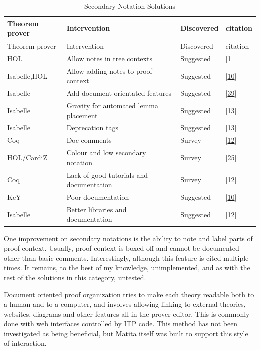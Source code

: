\documentclass[
]{article}
\begin{document}
\hypertarget{tbl:secondary_notation}{}
\begin{longtable}[]{@{}llll@{}}
\caption{\label{tbl:secondary_notation}Secondary Notation
Solutions}\tabularnewline
\toprule
Theorem prover & Intervention & Discovered & citation \\
\midrule
\endfirsthead
\toprule
Theorem prover & Intervention & Discovered & citation \\
\midrule
\endhead
HOL & Allow notes in tree contexts & Suggested &
{[}\protect\hyperlink{ref-aitken_interactive_1998}{1}{]} \\
Isabelle,HOL & Allow adding notes to proof context & Suggested &
{[}\protect\hyperlink{ref-beckert_evaluating_2012}{10}{]} \\
Isabelle & Add document orientated features & Suggested &
{[}\protect\hyperlink{ref-wenzel_isabelle_2011}{39}{]} \\
Isabelle & Gravity for automated lemma placement & Suggested &
{[}\protect\hyperlink{ref-bourke_challenges_2012}{13}{]} \\
Isabelle & Deprecation tags & Suggested &
{[}\protect\hyperlink{ref-bourke_challenges_2012}{13}{]} \\
Coq & Doc comments & Survey &
{[}\protect\hyperlink{ref-berman_development_2014}{12}{]} \\
HOL/CardiZ & Colour and low secondary notation & Survey &
{[}\protect\hyperlink{ref-kadoda_cognitive_2000}{25}{]} \\
Coq & Lack of good tutorials and documentation & Survey &
{[}\protect\hyperlink{ref-berman_development_2014}{12}{]} \\
KeY & Poor documentation & Suggested &
{[}\protect\hyperlink{ref-beckert_evaluating_2012}{10}{]} \\
Isabelle & Better libraries and documentation & Suggested &
{[}\protect\hyperlink{ref-berman_development_2014}{12}{]} \\
\bottomrule
\end{longtable}

One improvement on secondary notations is the ability to note and label
parts of proof context. Usually, proof context is boxed off and cannot
be documented other than basic comments. Interestingly, although this
feature is cited multiple times. It remains, to the best of my
knowledge, unimplemented, and as with the rest of the solutions in this
category, untested.

Document oriented proof organization tries to make each theory readable
both to a human and to a computer, and involves allowing linking to
external theories, websites, diagrams and other features all in the
prover editor. This is commonly done with web interfaces controlled by
ITP code. This method has not been investigated as being beneficial, but
Matita itself was built to support this style of interaction.
\end{document}

